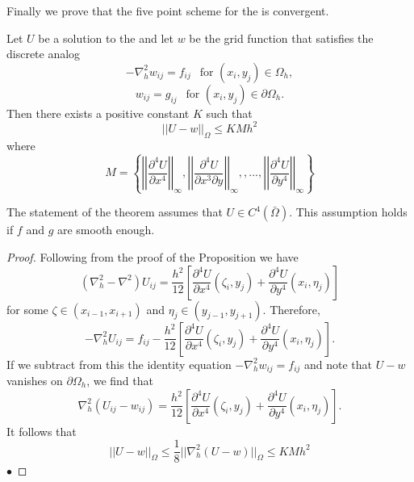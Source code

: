 Finally we prove that the five point scheme for the  is convergent.
\begin{theorem}
Let $U$ be a solution to the  and let $w$ be the grid function
that satisfies the discrete analog
\[-\nabla_h^2w_{ij}=f_{ij} \ \ \mbox{ for } (x_i,y_j)\in\Omega_h, \]
\[w_{ij}=g_{ij} \ \ \mbox{ for } (x_i,y_j)\in\partial\Omega_h. \]
Then there exists a positive constant $K$ such that
\[||U-w||_{\Omega}\leq KMh^2 \]
where
\[ M=\left\{
\left|\left|\frac{\partial^4 U}{\partial x^4} \right|\right|_{\infty},
\left|\left|\frac{\partial^4 U}{\partial x^3\partial y} \right|\right|_{\infty},
,...,
\left|\left|\frac{\partial^4 U}{\partial y^4} \right|\right|_{\infty}
 \right\}
\]
\end{theorem}
The statement of the theorem assumes that $U\in C^4(\bar{\Omega})$. This assumption
holds if $f$ and $g$ are smooth enough.
\begin{proof}
Following from the proof of the Proposition we have
\[ (\nabla_h^2-\nabla^2)U_{ij}=\frac{h^2}{12}\left[ \frac{\partial^4 U}{\partial x^4}(\zeta_i,y_j)+\frac{\partial^4 U}{\partial y^4}(x_i,\eta_j) \right]\]
for some $\zeta \in (x_{i-1},x_{i+1})$ and $\eta_j\in(y_{j-1},y_{j+1})$.  Therefore,
\[ -\nabla_h^2U_{ij}=f_{ij}-\frac{h^2}{12}\left[ \frac{\partial^4 U}{\partial x^4}(\zeta_i,y_j)+\frac{\partial^4 U}{\partial y^4}(x_i,\eta_j) \right].\]
If we subtract from this the identity equation $-\nabla_h^2w_{ij}=f_{ij}$ and note
that $U-w$ vanishes on $\partial\Omega_h$, we find that
\[ \nabla_h^2(U_{ij}-w_{ij})=\frac{h^2}{12}\left[ \frac{\partial^4 U}{\partial x^4}(\zeta_i,y_j)+\frac{\partial^4 U}{\partial y^4}(x_i,\eta_j) \right].\]
It follows that
\[ ||U-w||_{\Omega}\leq\frac{1}{8}||\nabla_h^2(U-w)||_{\Omega}\leq KMh^2\]
$\bullet$\end{proof}